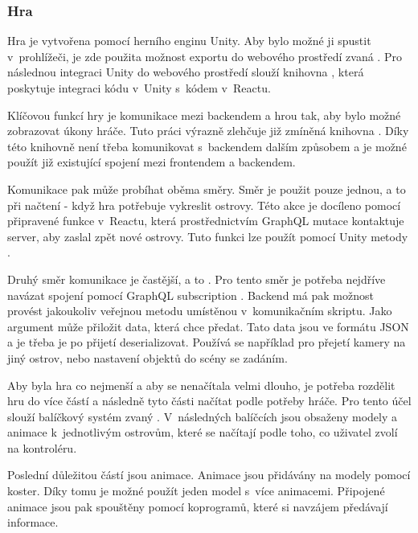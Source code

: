 \subsubsection{Hra}
Hra je vytvořena pomocí herního enginu Unity. Aby bylo možné ji spustit v~prohlížeči, je zde použita možnost exportu do webového prostředí zvaná .
Pro následnou integraci Unity do webového prostředí slouží knihovna \cite{react-unity-webgl}, která poskytuje integraci kódu v~Unity s~kódem v~Reactu.

Klíčovou funkcí hry je komunikace mezi backendem a hrou tak, aby bylo možné zobrazovat úkony hráče. Tuto práci výrazně zlehčuje již zmíněná knihovna \cite{react-unity-webgl}. Díky této knihovně není třeba komunikovat s~backendem dalším způsobem a je možné použít již existující spojení mezi frontendem a backendem.\par
Komunikace pak může probíhat oběma směry. Směr  je použit pouze jednou, a to při načtení - když hra potřebuje vykreslit ostrovy. Této akce je docíleno pomocí připravené funkce v~Reactu, která prostřednictvím GraphQL mutace  kontaktuje server, aby zaslal zpět nové ostrovy. Tuto funkci lze použít pomocí Unity metody .\par
Druhý směr komunikace je častější, a to . Pro tento směr je potřeba nejdříve navázat spojení pomocí GraphQL subscription . Backend má pak možnost provést jakoukoliv veřejnou metodu umístěnou v~komunikačním skriptu. Jako argument může přiložit data, která chce předat. Tato data jsou ve formátu JSON a je třeba je po přijetí deserializovat. Používá se například pro přejetí kamery na jiný ostrov, nebo nastavení objektů do scény se zadáním.

Aby byla hra co nejmenší a aby se nenačítala velmi dlouho, je potřeba rozdělit hru do více částí a následně tyto části načítat podle potřeby hráče. Pro tento účel slouží balíčkový systém zvaný \cite{AssetBundle}. V~následných balíčcích jsou obsaženy modely a animace k~jednotlivým ostrovům, které se načítají podle toho, co uživatel zvolí na kontroléru.

Poslední důležitou částí jsou animace. Animace jsou přidávány na modely pomocí koster. Díky tomu je možné použít jeden model s~více animacemi. Připojené animace jsou pak spouštěny pomocí koprogramů, které si navzájem předávají informace. 
